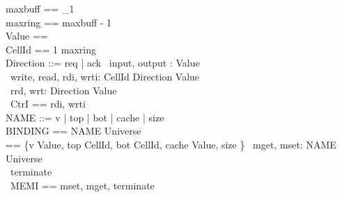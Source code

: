 \documentclass[10pt]{article}
\begin{document}
\begin{circus}
    [UNIVERSE]
    \also maxbuff == \nat_1 \\
    \also maxring == maxbuff - 1 \\
    \also Value == \nat \\
    \also CellId == 1 \upto maxring \\
    \also Direction ::=  req | ack
    \also \circchannel\ input, output : Value \\
    \also \circchannel\ write, read, rdi, wrti: CellId \cross Direction \cross Value \\
    \also \circchannel\ rrd, wrt: Direction \cross Value \\
    \also \circchannelset\ CtrI == \lchanset rdi, wrti \rchanset \\
    \also NAME ::= v | top | bot | cache | size \\
    \also BINDING == NAME \fun Universe \\
    \also \delta == \{v \mapsto Value, top \mapsto CellId, bot \mapsto CellId, cache \mapsto Value, size \mapsto \nat \}
    \also \circchannel\ mget, mset: NAME \cross Universe \\
    \also \circchannel\ terminate \\
    \also \circchannelset\ MEMI == \lchanset mset, mget, terminate \rchanset \\
\end{circus}%
\end{document}
